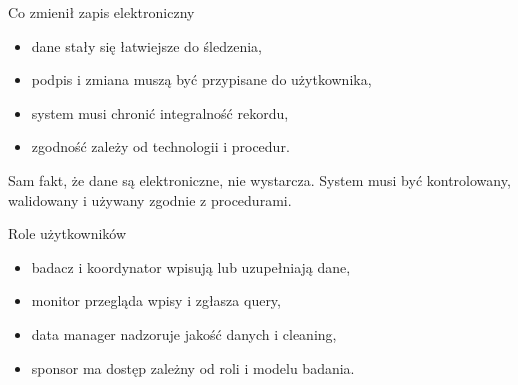 \begin{frame}{Co zmienił zapis elektroniczny}
  \begin{itemize}
    \item dane stały się łatwiejsze do śledzenia,
    \item podpis i zmiana muszą być przypisane do użytkownika,
    \item system musi chronić integralność rekordu,
    \item zgodność zależy od technologii i procedur.
  \end{itemize}

  \vspace{0.3cm}

  \begin{ExampleBox}
    Sam fakt, że dane są elektroniczne, nie wystarcza. System musi być kontrolowany, walidowany i używany zgodnie z procedurami.
  \end{ExampleBox}
\end{frame}

\begin{frame}{Role użytkowników}
  \begin{itemize}
    \item badacz i koordynator wpisują lub uzupełniają dane,
    \item monitor przegląda wpisy i zgłasza query,
    \item data manager nadzoruje jakość danych i cleaning,
    \item sponsor ma dostęp zależny od roli i modelu badania.
  \end{itemize}
\end{frame}

